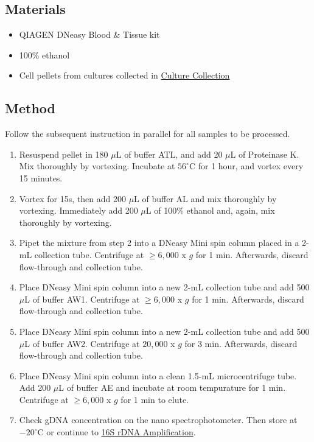 \documentclass[twocolumn]{article}
\begin{document}
\subsection{Materials}
\begin{itemize}
  \item QIAGEN DNeasy Blood \& Tissue kit
  \item 100\% ethanol
  \item Cell pellets from cultures collected in \hyperref[CC]{Culture Collection}
\end{itemize}

\subsection{Method}
Follow the subsequent instruction in parallel for all samples to be processed.
\begin{enumerate}
  \item Resuspend pellet in 180 $\mu$L of buffer ATL, and add 20 $\mu$L of Proteinase K. Mix thoroughly by vortexing. Incubate at $56^\circ$C for 1 hour, and vortex every 15 minutes.
  \item Vortex for 15s, then add 200 $\mu$L of buffer AL and mix thoroughly by vortexing. Immediately add 200 $\mu$L of 100\% ethanol and, again, mix thoroughly by vortexing.
  \item Pipet the mixture from step 2 into a DNeasy Mini spin column placed in a 2-mL collection tube. Centrifuge at $\geq 6,000$ x $g$ for 1 min. Afterwards, discard flow-through and collection tube.
  \item Place DNeasy Mini spin column into a new 2-mL collection tube and add 500 $\mu$L of buffer AW1. Centrifuge at $\geq 6,000$ x $g$ for 1 min. Afterwards, discard flow-through and collection tube.
  \item Place DNeasy Mini spin column into a new 2-mL collection tube and add 500 $\mu$L of buffer AW2. Centrifuge at $20,000$ x $g$ for 3 min. Afterwards, discard flow-through and collection tube.
  \item Place DNeasy Mini spin column into a clean 1.5-mL microcentrifuge tube. Add 200 $\mu$L of buffer AE and incubate at room tempurature for 1 min. Centrifuge at $\geq 6,000$ x $g$ for 1 min to elute.
  \item Check gDNA concentration on the nano spectrophotometer. Then store at $-20^\circ$C or continue to \hyperref[1rA]{16S rDNA Amplification}.
\end{enumerate}
\end{document}
